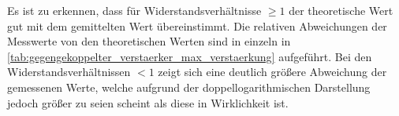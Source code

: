 













\FloatBarrier

Es ist zu erkennen, dass für 
Widerstandsverhältnisse $ \geq 1$ der theoretische Wert gut mit dem gemittelten 
Wert übereinstimmt. Die relativen Abweichungen der Messwerte von den 
theoretischen Werten sind in einzeln in
\cref{tab:gegengekoppelter_verstaerker_max_verstaerkung} aufgeführt.
Bei den Widerstandsverhältnissen  $ < 1$ zeigt sich eine deutlich größere 
Abweichung der gemessenen Werte, welche aufgrund der doppellogarithmischen 
Darstellung jedoch größer zu seien scheint als diese in Wirklichkeit ist. 

